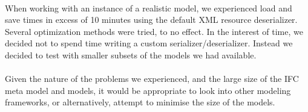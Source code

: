 \paragraph{}
When working with an instance of a realistic model, we experienced load and save times in excess of 10 minutes using the default XML resource deserializer. Several optimization methods were tried\cite{emfperformancetips, emfperformanceandextensibility}, to no effect. In the interest of time, we decided not to spend time writing a custom serializer/deserializer. Instead we decided to test with smaller subsets of the models we had available.
\paragraph{}
Given the nature of the problems we experienced, and the large size of the IFC meta model and models, it would be appropriate to look into other modeling frameworks, or alternatively, attempt to minimise the size of the models.
